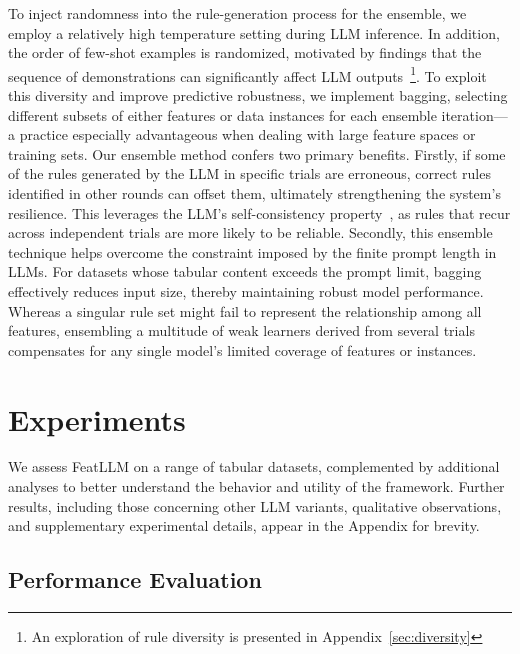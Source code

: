 To inject randomness into the rule-generation process for the ensemble, we employ a relatively high temperature setting during LLM inference. In addition, the order of few-shot examples is randomized, motivated by findings that the sequence of demonstrations can significantly affect LLM outputs~\cite{lu2022fantastically}\footnote{An exploration of rule diversity is presented in Appendix~\ref{sec:diversity}}. To exploit this diversity and improve predictive robustness, we implement bagging, selecting different subsets of either features or data instances for each ensemble iteration—a practice especially advantageous when dealing with large feature spaces or training sets. Our ensemble method confers two primary benefits. Firstly, if some of the rules generated by the LLM in specific trials are erroneous, correct rules identified in other rounds can offset them, ultimately strengthening the system’s resilience. This leverages the LLM's self-consistency property~\cite{wang2022self}, as rules that recur across independent trials are more likely to be reliable. Secondly, this ensemble technique helps overcome the constraint imposed by the finite prompt length in LLMs. For datasets whose tabular content exceeds the prompt limit, bagging effectively reduces input size, thereby maintaining robust model performance. Whereas a singular rule set might fail to represent the relationship among all features, ensembling a multitude of weak learners derived from several trials compensates for any single model’s limited coverage of features or instances.

\section{Experiments}
We assess \textsf{FeatLLM} on a range of tabular datasets, complemented by additional analyses to better understand the behavior and utility of the framework. Further results, including those concerning other LLM variants, qualitative observations, and supplementary experimental details, appear in the Appendix for brevity.

\subsection{Performance Evaluation}
